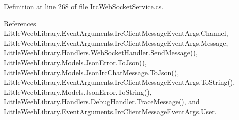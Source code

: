Definition at line 268 of file Irc\+Web\+Socket\+Service.\+cs.



References Little\+Weeb\+Library.\+Event\+Arguments.\+Irc\+Client\+Message\+Event\+Args.\+Channel, Little\+Weeb\+Library.\+Event\+Arguments.\+Irc\+Client\+Message\+Event\+Args.\+Message, Little\+Weeb\+Library.\+Handlers.\+Web\+Socket\+Handler.\+Send\+Message(), Little\+Weeb\+Library.\+Models.\+Json\+Error.\+To\+Json(), Little\+Weeb\+Library.\+Models.\+Json\+Irc\+Chat\+Message.\+To\+Json(), Little\+Weeb\+Library.\+Event\+Arguments.\+Irc\+Client\+Message\+Event\+Args.\+To\+String(), Little\+Weeb\+Library.\+Models.\+Json\+Error.\+To\+String(), Little\+Weeb\+Library.\+Handlers.\+Debug\+Handler.\+Trace\+Message(), and Little\+Weeb\+Library.\+Event\+Arguments.\+Irc\+Client\+Message\+Event\+Args.\+User.


